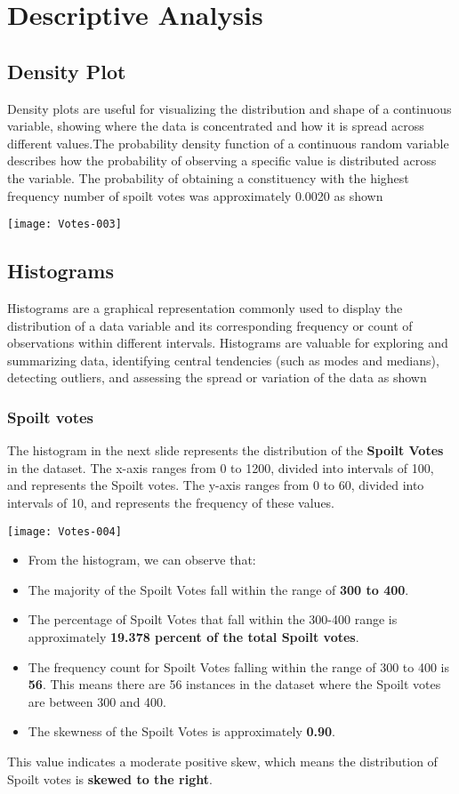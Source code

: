 \documentclass[fleqn,a4paper,12pt]{article}
\begin{document}
\section{Descriptive Analysis}
\subsection{Density Plot}

Density plots are useful for visualizing the distribution and shape of a continuous variable, showing where the data is concentrated and how it is spread across different values.The probability density function of a continuous random variable describes how the probability of observing a specific value is distributed across the variable. The probability of obtaining a constituency with the highest frequency number of spoilt votes was approximately 0.0020 as shown


\texttt{[image: Votes-003]}

\subsection{Histograms}

Histograms are a graphical representation commonly used to display the distribution of a data variable and its corresponding frequency or count of observations within different intervals. Histograms are valuable for exploring and summarizing data, identifying central tendencies (such as modes and medians), detecting outliers, and assessing the spread or variation of the data as shown

\subsubsection{Spoilt votes}


The histogram in the next slide represents the distribution of the \textbf {Spoilt Votes} in the dataset. The x-axis ranges from 0 to 1200, divided into intervals of 100, and represents the Spoilt votes. The y-axis ranges from 0 to 60, divided into intervals of 10, and represents the frequency of these values.


\texttt{[image: Votes-004]}

\begin{itemize}
\item From the histogram, we can observe that:
\item The majority of the Spoilt Votes fall within the range of \textbf{300 to 400}.
\item The percentage of Spoilt Votes that fall within the 300-400 range is approximately \textbf{19.378 percent of the total Spoilt votes}.
\item The frequency count for Spoilt Votes falling within the range of 300 to 400 is \textbf{56}. This means there are 56 instances in the dataset where the Spoilt votes are between 300 and 400.
\item The skewness of the Spoilt Votes is approximately \textbf{0.90}.
\end{itemize}
This value indicates a moderate positive skew, which means the distribution of Spoilt votes is \textbf{skewed to the right}.
\end{document}
